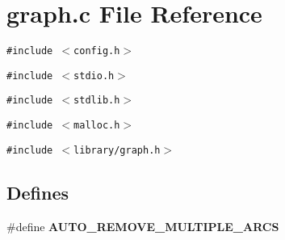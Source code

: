 \section{graph.c File Reference}
\label{graph_8c}
{\tt \#include $<$config.h$>$}\par
{\tt \#include $<$stdio.h$>$}\par
{\tt \#include $<$stdlib.h$>$}\par
{\tt \#include $<$malloc.h$>$}\par
{\tt \#include $<$library/graph.h$>$}\par
\subsection*{Defines}
\begin{CompactItemize}
\item 
\#define \bf{AUTO\_\-REMOVE\_\-MULTIPLE\_\-ARCS}
\end{CompactItemize}
